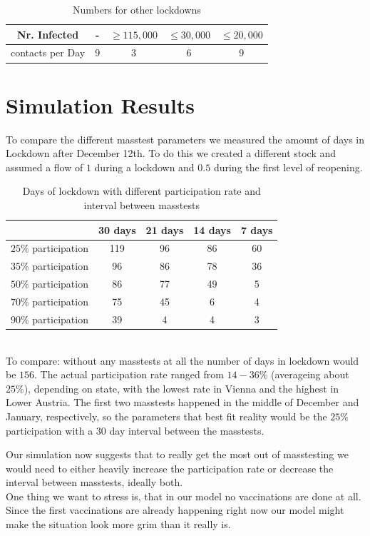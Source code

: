 \documentclass
[
    a4paper,
    11pt,
    bibliography = totoc,
    listof = totoc,
    headinclude = true,
]
{scrreport}
\begin{document}
\begin{table}[!h]
  \begin{center}
  \begin{tabular}{|c||c|c|c|c|}
  \hline
    Nr. Infected &- & $\geq 115,000$ & $\leq 30,000$ & $\leq 20,000$ \\
    \hline
    contacts per Day & 9 & 3 & 6 & 9 \\
    \hline
  \end{tabular}
  \end{center}
  \caption{Numbers for other lockdowns}
\end{table}

\chapter{Simulation Results}

To compare the different masstest parameters we measured the amount of days in
Lockdown after December 12th. To do this we created a different stock and assumed
a flow of $1$ during a lockdown and $0.5$ during the first level of reopening.
\begin{table}[!h]
{\small%
\begin{center}
\begin{tabular}{|c||c|c|c|c|}
\hline
& 30 days    & 21 days   & 14 days  & 7 days  \\
 \hline
 \hline
     $25\%$ participation & 119 &96 & 86 & 60\\
 \hline
     $35\%$ participation & 96 &  86&  78  & 36   \\
 \hline
     $50\%$ participation & 86 & 77 & 49 & 5\\
 \hline
     $70\%$ participation & 75 &  45 & 6 & 4 \\
 \hline
     $90\%$ participation & 39 &4 &4  & 3\\
     \hline
\end{tabular}
\end{center}
}

\caption{Days of lockdown with different participation rate and interval between masstests}
\end{table} \\
To compare: without any masstests at all the number of days in lockdown would be
$156$. The actual participation rate ranged from $14-36\%$ (averageing about $25\%$), depending on state, with the lowest rate in Vienna and the highest in Lower Austria. The first two masstests happened in the middle of December and January, respectively, so the parameters that best fit reality would be the $25\%$ participation with a $30$ day interval between the masstests.

Our simulation now suggests that to really get the most out of masstesting we would need to either heavily increase the participation rate or decrease the interval between masstests, ideally both. \\

One thing we want to stress is, that in our model no vaccinations are done at all. Since the first vaccinations are already happening right now our model might make the situation look more grim than it really is.

\printbibliography{}
\end{document}
